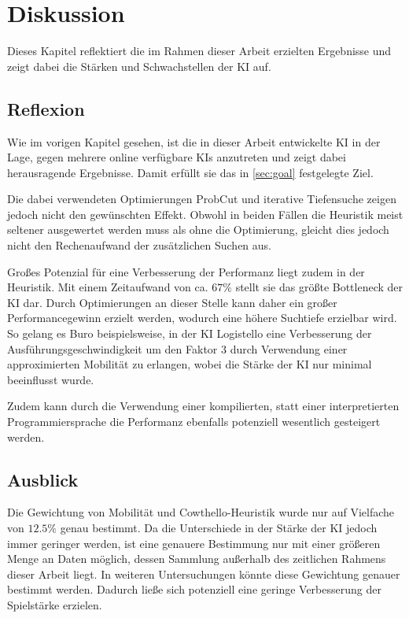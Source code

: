 
\chapter{Diskussion}
\label{chap:diskussion}
Dieses Kapitel reflektiert die im Rahmen dieser Arbeit erzielten Ergebnisse und zeigt dabei die Stärken und
Schwachstellen der \ac{KI} auf.

\section{Reflexion}
Wie im vorigen Kapitel gesehen, ist die in dieser Arbeit entwickelte \ac{KI} in der Lage, gegen mehrere
online verfügbare \acp{KI} anzutreten und zeigt dabei herausragende Ergebnisse. Damit erfüllt sie das in \autoref{sec:goal}
festgelegte Ziel.

Die dabei verwendeten Optimierungen ProbCut und iterative Tiefensuche zeigen jedoch nicht den gewünschten Effekt.
Obwohl in beiden Fällen die Heuristik meist seltener ausgewertet werden muss als ohne die Optimierung, gleicht dies jedoch
nicht den Rechenaufwand der zusätzlichen Suchen aus.

Großes Potenzial für eine Verbesserung der Performanz liegt zudem in der Heuristik. Mit einem Zeitaufwand von ca.
\(67\%\) stellt sie das größte Bottleneck der \ac{KI} dar. Durch Optimierungen an dieser Stelle kann daher ein großer
Performancegewinn erzielt werden, wodurch eine höhere Suchtiefe erzielbar wird. So gelang es Buro beispielsweise, in der
\ac{KI} Logistello eine Verbesserung der Ausführungsgeschwindigkeit um den Faktor 3 durch Verwendung einer approximierten
Mobilität zu erlangen, wobei die Stärke der \ac{KI} nur minimal beeinflusst wurde. \cite[S.~8]{evaluationfunctions}

Zudem kann durch die Verwendung einer kompilierten, statt einer interpretierten Programmiersprache die Performanz
ebenfalls potenziell wesentlich gesteigert werden.


\section{Ausblick}
Die Gewichtung von Mobilität und Cowthello-Heuristik wurde nur auf Vielfache von \(12.5\%\) genau bestimmt. Da die
Unterschiede in der Stärke der \ac{KI} jedoch immer geringer werden, ist eine genauere Bestimmung nur mit einer größeren
Menge an Daten möglich, dessen Sammlung außerhalb des zeitlichen Rahmens dieser Arbeit liegt. In weiteren Untersuchungen
könnte diese Gewichtung genauer bestimmt werden. Dadurch ließe sich potenziell eine geringe Verbesserung der Spielstärke
erzielen.

